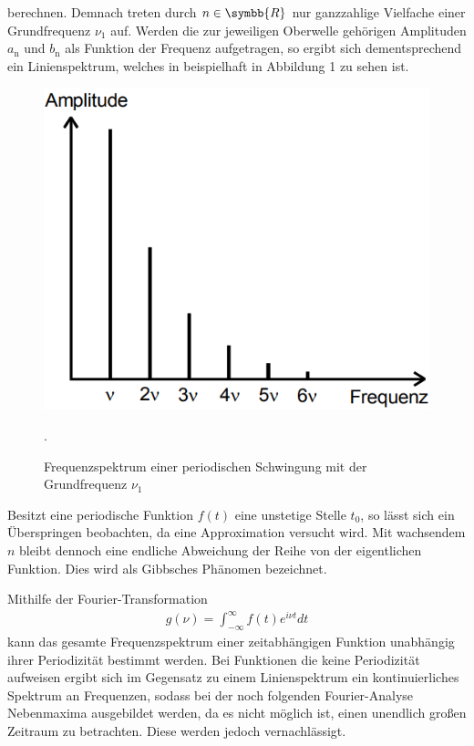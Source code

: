 berechnen. Demnach treten durch $n \in \symbb{R}$ nur ganzzahlige Vielfache einer Grundfrequenz $\nu_\text{1}$ auf.
Werden die zur jeweiligen Oberwelle gehörigen Amplituden $a_\text{n}$ und $b_\text{n}$ als Funktion der Frequenz
aufgetragen, so ergibt sich dementsprechend ein Linienspektrum, welches in beispielhaft in Abbildung 1
zu sehen ist.

\begin{figure}
\centering
\includegraphics[scale=0.5]{frequenz.png}
\caption{Frequenzspektrum einer periodischen Schwingung mit der Grundfrequenz $\nu_\text{1}$ \cite[S. 271]{sample}}.
\label{fig:frequenz}
\end{figure}

Besitzt eine periodische Funktion $f(t)$ eine unstetige Stelle $t_\text{0}$, so lässt sich ein
Überspringen beobachten, da eine Approximation versucht wird. Mit wachsendem $n$ bleibt dennoch
eine endliche Abweichung der Reihe von der eigentlichen Funktion. Dies wird als Gibbsches Phänomen bezeichnet.

Mithilfe der Fourier-Transformation
\begin{align}
g(\nu) = \int_{-\infty}^\infty f(t) e^{i \nu t} dt
\end{align}
kann das gesamte Frequenzspektrum einer zeitabhängigen Funktion
unabhängig ihrer Periodizität bestimmt werden.
Bei Funktionen die keine Periodizität aufweisen ergibt sich 
im Gegensatz zu einem Linienspektrum ein kontinuierliches Spektrum an Frequenzen, sodass bei der noch folgenden
Fourier-Analyse Nebenmaxima ausgebildet werden, da es nicht möglich ist, einen unendlich
großen Zeitraum zu betrachten. Diese werden jedoch vernachlässigt.
